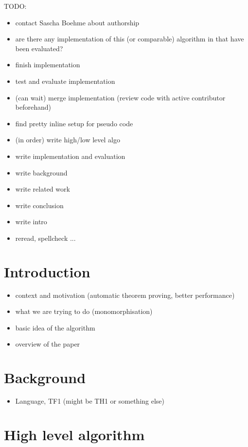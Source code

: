 \documentclass{article}
\begin{document}
TODO:
    \begin{itemize}
        \item contact Sascha Boehme about authorship
        \item are there any implementation of this (or comparable) algorithm in that have been evaluated?
        \item finish implementation
        \item test and evaluate implementation
        \item (can wait) merge implementation (review code with active contributor beforehand)
        \item find pretty inline setup for pseudo code
        \item (in order) write high/low level algo
        \item write implementation and evaluation
        \item write background
        \item write related work
        \item write conclusion
        \item write intro
        \item reread, spellcheck ...
    \end{itemize}

\section{Introduction}
\begin{itemize}
    \item context and motivation (automatic theorem proving, better performance)
    \item what we are trying to do (monomorphisation)
    \item basic idea of the algorithm 
    \item overview of the paper
\end{itemize}

\section{Background}

\begin{itemize}
    \item Language, TF1 (might be TH1 or something else)
\end{itemize}

\section{High level algorithm}
\end{document}
